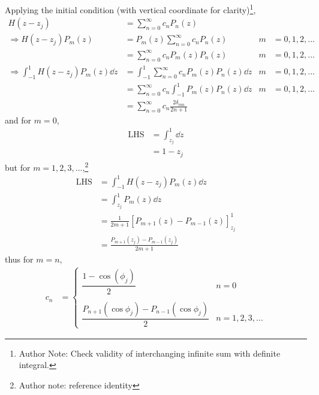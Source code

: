 \documentclass{report}
\newcommand\Par[1]{{ \left({#1}\right) }}
\newcommand\Brack[1]{{ \left[{#1}\right] }}
\begin{document}
Applying the initial condition (with vertical coordinate for clarity)\footnote{Author Note: Check validity of interchanging infinite sum with definite integral.},
\begin{align*}
	H(z - z_j) &= \sum_{n = 0}^\infty c_n P_n(z) \\
	\Rightarrow H(z - z_j) P_m(z) &= P_m(z) \sum_{n = 0}^\infty c_n P_n(z) & m &= 0, 1, 2, ... \\
	&= \sum_{n = 0}^\infty c_n P_m(z) P_n(z) & m &= 0, 1, 2, ... \\
	\Rightarrow \int_{-1}^1 H(z - z_j) P_m(z) \dd{z} &= \int_{-1}^1 \sum_{n = 0}^\infty c_n P_m(z) P_n(z) \dd{z} & m &= 0, 1, 2, ... \\
	&= \sum_{n=0}^\infty c_n \int_{-1}^1 P_m(z) P_n(z) \dd{z} & m &= 0, 1, 2, ... \\
	&= \sum_{n=0}^\infty c_n \frac{2 \delta_{mn}}{2n + 1}
\end{align*}
and for $m = 0$,
\begin{align*}
	\text{LHS} &= \int_{z_j}^1 \dd{z} \\
	&= 1 - z_j
\end{align*}
but for $m = 1, 2, 3, ...$,\footnote{Author note: reference identity}
\begin{align*}
	\text{LHS} &= \int_{-1}^1 H(z - z_j) P_m(z) \dd{z} \\
	&= \int_{z_j}^1 P_m(z) \dd{z} \\
	&= \frac{1}{2m + 1} \Brack{P_{m+1}(z) - P_{m-1}(z)}_{z_j}^1 \\
	&= \frac{P_{m+1}(z_j) - P_{m-1}(z_j)}{2m + 1}
\end{align*}
thus for $m = n$,
\begin{align*}
	c_n &= \begin{cases}
		\dfrac{1 - \cos(\phi_j)}{2} & n = 0 \\ \\
		\dfrac{P_{n+1}\Par{\cos\phi_j} - P_{n-1}\Par{\cos\phi_j}}{2} & n = 1, 2, 3, ...
	\end{cases}
\end{align*}
\end{document}
